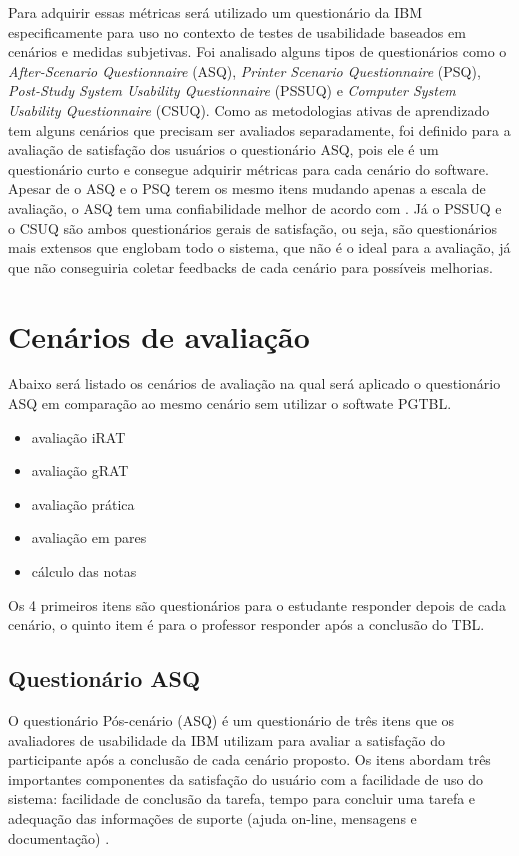 Para adquirir essas métricas será utilizado um questionário da IBM especificamente para uso no contexto de testes de
usabilidade baseados em cenários e medidas subjetivas. Foi analisado alguns tipos de questionários como o
\textit{After-Scenario Questionnaire} (ASQ), \textit{Printer Scenario Questionnaire} (PSQ), \textit{Post-Study System
Usability Questionnaire} (PSSUQ) e \textit{Computer System Usability Questionnaire} (CSUQ). Como as metodologias ativas
de aprendizado tem alguns cenários que precisam ser avaliados separadamente, foi definido para a avaliação de satisfação
dos usuários o questionário ASQ, pois ele é um questionário curto e consegue adquirir métricas para cada cenário do
software. Apesar de o ASQ e o PSQ terem os mesmo itens mudando apenas a escala de avaliação, o ASQ tem uma
confiabilidade melhor de acordo com \cite{questionario}. Já o PSSUQ e o CSUQ são ambos questionários gerais de
satisfação, ou seja, são questionários mais extensos que englobam todo o sistema, que não é o ideal para a avaliação, já
que não conseguiria coletar feedbacks de cada cenário para possíveis melhorias.

\section{Cenários de avaliação}

Abaixo será listado os cenários de avaliação na qual será aplicado o questionário ASQ em comparação ao mesmo cenário sem
utilizar o softwate PGTBL.

\begin{itemize}
  \item avaliação iRAT
  \item avaliação gRAT
  \item avaliação prática
  \item avaliação em pares
  \item cálculo das notas
\end{itemize}

Os 4 primeiros itens são questionários para o estudante responder depois de cada cenário, o quinto item é
para o professor responder após a conclusão do TBL.

\subsection{Questionário ASQ}

O questionário Pós-cenário (ASQ) é um questionário de três itens que os avaliadores de usabilidade da IBM utilizam para
avaliar a satisfação do participante após a conclusão de cada cenário proposto. Os itens abordam três importantes
componentes da satisfação do usuário com a facilidade de uso do sistema: facilidade de conclusão da tarefa, tempo para
concluir uma tarefa e adequação das informações de suporte (ajuda on-line, mensagens e documentação)
\cite{questionario}.

